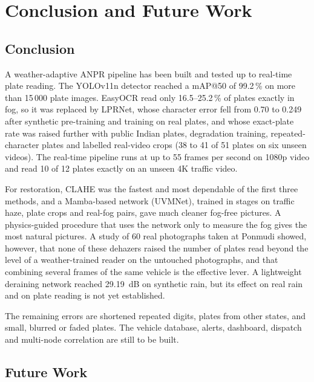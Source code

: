 \chapter{Conclusion and Future Work}
\label{ch:conclusion}

\section{Conclusion}

A weather-adaptive ANPR pipeline has been built and tested up to real-time
plate reading. The YOLOv11n detector reached a mAP@50 of 99.2\,\% on more than
15\,000 plate images. EasyOCR read only 16.5--25.2\,\% of plates exactly in fog,
so it was replaced by LPRNet, whose character error fell from 0.70 to 0.249
after synthetic pre-training and training on real plates, and whose exact-plate
rate was raised further with public Indian plates, degradation training,
repeated-character plates and labelled real-video crops (38 to 41 of 51 plates
on six unseen videos). The real-time pipeline runs at up to 55 frames per second
on 1080p video and read 10 of 12 plates exactly on an unseen 4K traffic video.

For restoration, CLAHE was the fastest and most dependable of the first three
methods, and a Mamba-based network (UVMNet), trained in stages on traffic haze,
plate crops and real-fog pairs, gave much cleaner fog-free pictures. A
physics-guided procedure that uses the network only to measure the fog gives
the most natural pictures. A study of 60 real photographs taken at Ponmudi
showed, however, that none of these dehazers raised the number of plates read
beyond the level of a weather-trained reader on the untouched photographs, and
that combining several frames of the same vehicle is the effective lever. A
lightweight deraining network reached 29.19~dB on synthetic rain, but its effect
on real rain and on plate reading is not yet established.

The remaining errors are shortened repeated digits, plates from other states,
and small, blurred or faded plates. The vehicle database, alerts, dashboard,
dispatch and multi-node correlation are still to be built.

\section{Future Work}

